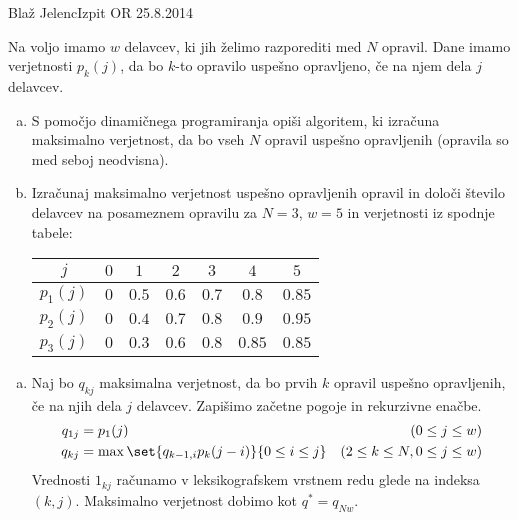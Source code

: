 \begin{naloga}{Blaž Jelenc}{Izpit OR 25.8.2014}
\begin{vprasanje}
Na voljo imamo $w$ delavcev, ki jih želimo razporediti med $N$ opravil.
Dane imamo verjetnosti $p_k(j)$,
da bo $k$-to opravilo uspešno opravljeno, če na njem dela $j$ delavcev.

\begin{enumerate}[(a)]
\item S pomočjo dinamičnega programiranja opiši algoritem,
ki izračuna maksimalno verjetnost,
da bo vseh $N$ opravil uspešno opravljenih (opravila so med seboj neodvisna).

\item Izračunaj maksimalno verjetnost uspešno opravljenih opravil
in določi število delavcev na posameznem opravilu
za $N = 3$, $w = 5$ in verjetnosti iz spodnje tabele:
\begin{center}
\begin{tabular}{c|cccccc}
$j$ & $0$ & $1$ & $2$ & $3$ & $4$ & $5$ \\ \hline
$p_1(j)$ & $0$ & $0.5$ & $0.6$ & $0.7$ & $0.8$  & $0.85$ \\
$p_2(j)$ & $0$ & $0.4$ & $0.7$ & $0.8$ & $0.9$  & $0.95$ \\
$p_3(j)$ & $0$ & $0.3$ & $0.6$ & $0.8$ & $0.85$ & $0.85$
\end{tabular}
\end{center}
\end{enumerate}
\end{vprasanje}

\begin{odgovor}
\begin{enumerate}[(a)]
\item Naj bo $q_{kj}$ maksimalna verjetnost,
da bo prvih $k$ opravil uspešno opravljenih,
če na njih dela $j$ delavcev.
Zapišimo začetne pogoje in rekurzivne enačbe.
\begin{align*}
q_{1j} &= p_1(j) & (0 \le j \le w) \\
q_{kj} &= \max\set{q_{k-1,i} p_k(j-i)}{0 \le i \le j} & (2 \le k \le N, 0 \le j \le w)
\end{align*}
Vrednosti $1_{kj}$ računamo v leksikografskem vrstnem redu
glede na indeksa $(k, j)$.
Maksimalno verjetnost dobimo kot $q^* = q_{Nw}$.


\end{enumerate}
\end{odgovor}
\end{naloga}
